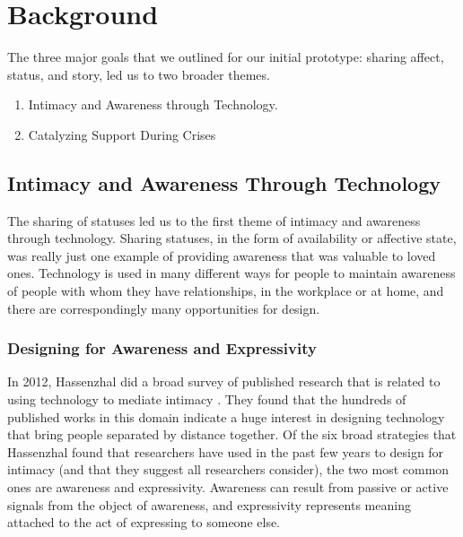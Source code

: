 \chapter{Background}
  The three major goals that we outlined for our initial prototype:
  sharing affect, status, and story, led us to two broader themes.
  \begin{enumerate}
  \item Intimacy and Awareness through Technology.
  \item Catalyzing Support During Crises
  \end{enumerate}

\section{Intimacy and Awareness Through Technology}
  The sharing of statuses led us to the first theme of
  intimacy and awareness through technology.
  Sharing statuses,
  in the form of availability or affective state,
  was really just one example of providing awareness that was valuable to loved ones.
  Technology is used in many different ways for people to maintain
  awareness of people with whom they have relationships,
  in the workplace or at home,
  and there are correspondingly many opportunities for design.

  \subsection{Designing for Awareness and Expressivity}
    In 2012, Hassenzhal did a broad survey of published research
    that is related to using technology to mediate intimacy
    \cite{hassenzhal12}.
    They found that the hundreds of published works in this domain indicate a
    huge interest in designing technology that bring people separated by distance together.
    Of the six broad strategies that Hassenzhal found
    that researchers have used in the past few years to design for intimacy
    (and that they suggest all researchers consider),
    the two most common ones are awareness and expressivity.
    Awareness can result from passive or active signals from
    the object of awareness,
    and expressivity represents meaning attached
    to the act of expressing to someone else.

